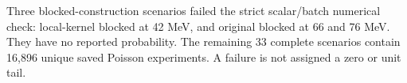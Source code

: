 Three blocked-construction scenarios failed the strict scalar/batch numerical check: local-kernel blocked at 42 MeV, and original blocked at 66 and 76 MeV. They have no reported probability. The remaining 33 complete scenarios contain 16,896 unique saved Poisson experiments. A failure is not assigned a zero or unit tail.
